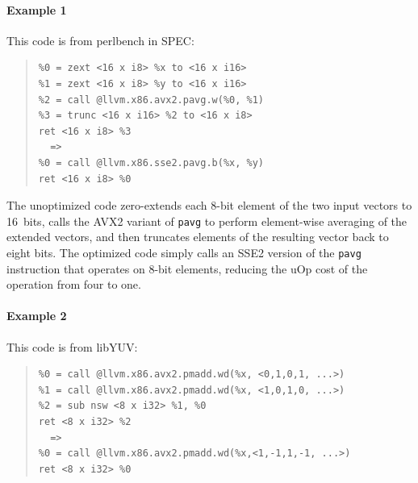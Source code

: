 \paragraph*{Example 1}

This code is from perlbench in SPEC:

{\begin{quote}\begin{verbatim}
%0 = zext <16 x i8> %x to <16 x i16>
%1 = zext <16 x i8> %y to <16 x i16>
%2 = call @llvm.x86.avx2.pavg.w(%0, %1)
%3 = trunc <16 x i16> %2 to <16 x i8>
ret <16 x i8> %3
  =>
%0 = call @llvm.x86.sse2.pavg.b(%x, %y)
ret <16 x i8> %0
\end{verbatim}
\end{quote}}

The unoptimized code zero-extends each 8-bit element of the two input
vectors to 16~bits, calls the AVX2 variant of \texttt{pavg} to perform
element-wise averaging of the extended vectors, and then truncates
elements of the resulting vector back to eight bits.
%
The optimized code simply calls an SSE2 version of the \texttt{pavg}
instruction that operates on 8-bit elements, reducing the uOp cost
of the operation from four to one.


\paragraph*{Example 2}

This code is from libYUV:

{\begin{quote}\begin{verbatim}
%0 = call @llvm.x86.avx2.pmadd.wd(%x, <0,1,0,1, ...>)
%1 = call @llvm.x86.avx2.pmadd.wd(%x, <1,0,1,0, ...>)
%2 = sub nsw <8 x i32> %1, %0
ret <8 x i32> %2
  =>
%0 = call @llvm.x86.avx2.pmadd.wd(%x,<1,-1,1,-1, ...>)
ret <8 x i32> %0
\end{verbatim}
\end{quote}}

